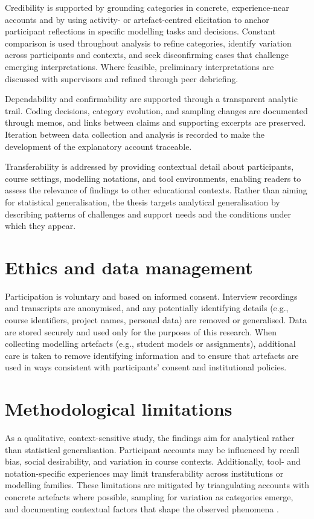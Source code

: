 Credibility is supported by grounding categories in concrete, experience-near accounts and by using activity- or artefact-centred elicitation to anchor participant reflections in specific modelling tasks and decisions. Constant comparison is used throughout analysis to refine categories, identify variation across participants and contexts, and seek disconfirming cases that challenge emerging interpretations. Where feasible, preliminary interpretations are discussed with supervisors and refined through peer debriefing.

Dependability and confirmability are supported through a transparent analytic trail. Coding decisions, category evolution, and sampling changes are documented through memos, and links between claims and supporting excerpts are preserved. Iteration between data collection and analysis is recorded to make the development of the explanatory account traceable.

Transferability is addressed by providing contextual detail about participants, course settings, modelling notations, and tool environments, enabling readers to assess the relevance of findings to other educational contexts. Rather than aiming for statistical generalisation, the thesis targets analytical generalisation by describing patterns of challenges and support needs and the conditions under which they appear.

\section{Ethics and data management}
\label{sec:method_ethics}

Participation is voluntary and based on informed consent. Interview recordings and transcripts are anonymised, and any potentially identifying details (e.g., course identifiers, project names, personal data) are removed or generalised. Data are stored securely and used only for the purposes of this research. When collecting modelling artefacts (e.g., student models or assignments), additional care is taken to remove identifying information and to ensure that artefacts are used in ways consistent with participants' consent and institutional policies.

\section{Methodological limitations}
\label{sec:method_limitations}

As a qualitative, context-sensitive study, the findings aim for analytical rather than statistical generalisation. Participant accounts may be influenced by recall bias, social desirability, and variation in course contexts. Additionally, tool- and notation-specific experiences may limit transferability across institutions or modelling families. These limitations are mitigated by triangulating accounts with concrete artefacts where possible, sampling for variation as categories emerge, and documenting contextual factors that shape the observed phenomena \cite{hoda2018socio,stol2016grounded}.

